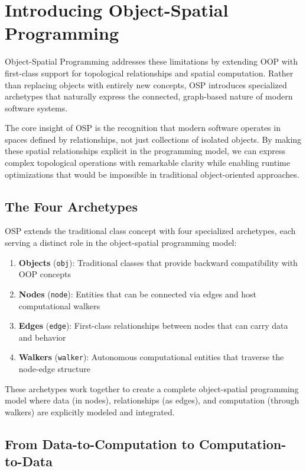 \section{Introducing Object-Spatial Programming}

Object-Spatial Programming addresses these limitations by extending OOP with first-class support for topological relationships and spatial computation. Rather than replacing objects with entirely new concepts, OSP introduces specialized archetypes that naturally express the connected, graph-based nature of modern software systems.

The core insight of OSP is the recognition that modern software operates in spaces defined by relationships, not just collections of isolated objects. By making these spatial relationships explicit in the programming model, we can express complex topological operations with remarkable clarity while enabling runtime optimizations that would be impossible in traditional object-oriented approaches.

\subsection{The Four Archetypes}

OSP extends the traditional class concept with four specialized archetypes, each serving a distinct role in the object-spatial programming model:

\begin{enumerate}
    \item \textbf{Objects} (\texttt{obj}): Traditional classes that provide backward compatibility with OOP concepts
    \item \textbf{Nodes} (\texttt{node}): Entities that can be connected via edges and host computational walkers
    \item \textbf{Edges} (\texttt{edge}): First-class relationships between nodes that can carry data and behavior
    \item \textbf{Walkers} (\texttt{walker}): Autonomous computational entities that traverse the node-edge structure
\end{enumerate}

These archetypes work together to create a complete object-spatial programming model where data (in nodes), relationships (as edges), and computation (through walkers) are explicitly modeled and integrated.

\subsection{From Data-to-Computation to Computation-to-Data}

